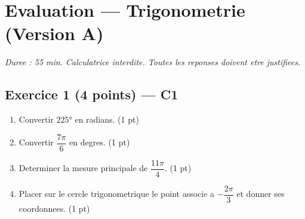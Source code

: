 

\section*{Evaluation — Trigonometrie (Version A)}
\textit{Duree : 55 min. Calculatrice interdite. Toutes les reponses doivent etre justifiees.}

\bigskip

\subsection*{Exercice 1 \hfill (4 points) — C1}

\begin{enumerate}
  \item Convertir $225°$ en radians. \hfill (1 pt)
  \item Convertir $\dfrac{7\pi}{6}$ en degres. \hfill (1 pt)
  \item Determiner la mesure principale de $\dfrac{11\pi}{4}$. \hfill (1 pt)
  \item Placer sur le cercle trigonometrique le point associe a $-\dfrac{2\pi}{3}$ et donner ses coordonnees. \hfill (1 pt)
\end{enumerate}

